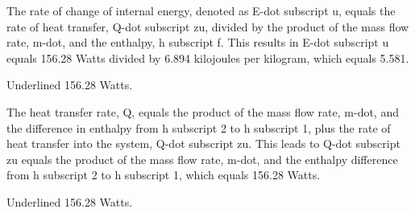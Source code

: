 The rate of change of internal energy, denoted as E-dot subscript u, equals the rate of heat transfer, Q-dot subscript zu, divided by the product of the mass flow rate, m-dot, and the enthalpy, h subscript f. This results in E-dot subscript u equals 156.28 Watts divided by 6.894 kilojoules per kilogram, which equals 5.581.

Underlined 156.28 Watts.

The heat transfer rate, Q, equals the product of the mass flow rate, m-dot, and the difference in enthalpy from h subscript 2 to h subscript 1, plus the rate of heat transfer into the system, Q-dot subscript zu. This leads to Q-dot subscript zu equals the product of the mass flow rate, m-dot, and the enthalpy difference from h subscript 2 to h subscript 1, which equals 156.28 Watts.

Underlined 156.28 Watts.